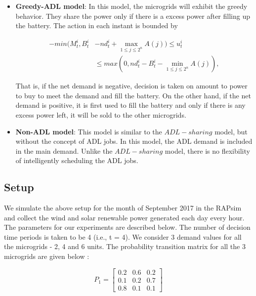 \begin{itemize}
	\item \textbf{Greedy-ADL model}: In this model, the microgrids will exhibit the greedy behavior. They share the power only if there is a excess power after filling up the battery. The action in each instant is bounded by   
	
	
	\begin{align}
	-min(M_t^i, B_t^i &- nd_t^i + \max_{1\leq j \leq 2^n} A(j) ) \leq u_t^i \nonumber\\ &\leq max(0, nd_t^i - B_t^i - \min_{1\leq j \leq 2^n} A(j)),
	\end{align}
	
	
	
	That is, if the net demand is negative, decision is taken on amount to power to buy to meet the demand and fill the battery. On the other hand, if the net demand is positive, it is first used to fill the battery and only if there is any excess power left, it will be sold to the other microgrids.
	
	\item \textbf{Non-ADL model}:  This model is similar to the $ADL-sharing$ model, but without the concept of ADL jobs. In this model, the ADL demand is included in the main demand. Unlike the $ADL-sharing$ model, there is no flexibility of intelligently scheduling the ADL jobs. 
	
\end{itemize}

\subsection{Setup}


We simulate the above setup for the month of September 2017 in the RAPsim and collect the wind and solar renewable power generated each day every hour. The parameters for our experiments are described below. The number of decision time periods is taken to be 4 (i.e., t = 4). We consider 3 demand values for all the microgrids - 2, 4 and 6 units. The probability transition matrix for all the 3 microgrids are given below :


\[
P_{1}=
\begin{bmatrix}
0.2 & 0.6 & 0.2 \\
0.1 & 0.2 & 0.7 \\
0.8 & 0.1 & 0.1
\end{bmatrix}
\]

